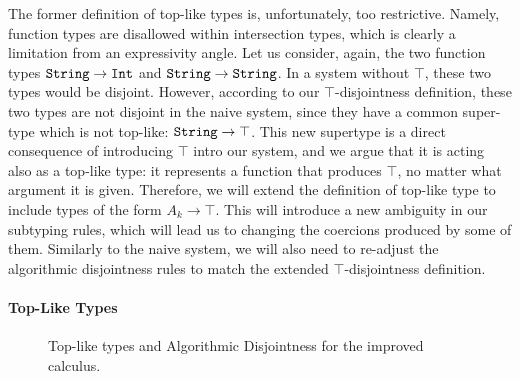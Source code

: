 The former definition of top-like types is, unfortunately, too restrictive.
Namely, function types are disallowed within intersection types, which is clearly a limitation from an expressivity
angle.
Let us consider, again, the two function types $\texttt{String} \to \texttt{Int}$ and $\texttt{String} \to \texttt{String}$. 
In a system without $\top$, these two types would be disjoint.
However, according to our $\top$-disjointness definition, these two types are not disjoint in the naive system, since they have a 
common super-type which is not top-like:
$\texttt{String} \to \top$.
This new supertype is a direct consequence of introducing $\top$ intro our system,
and we argue that it is acting also as a top-like type: it represents a function that produces
$\top$, no matter what argument it is given.
Therefore, we will extend the definition of top-like type to include types of the form $A_k \to \top$.
This will introduce a new ambiguity in our subtyping rules, which will lead us to changing the coercions produced by some
of them.
Similarly to the naive system, we will also need to re-adjust the algorithmic disjointness rules to match the 
extended $\top$-disjointness definition. 

\paragraph{Top-Like Types}

\begin{figure}[h]


  \caption{Top-like types and Algorithmic Disjointness for the improved calculus.}
  \label{fig:tltypesextdis}
\end{figure}

